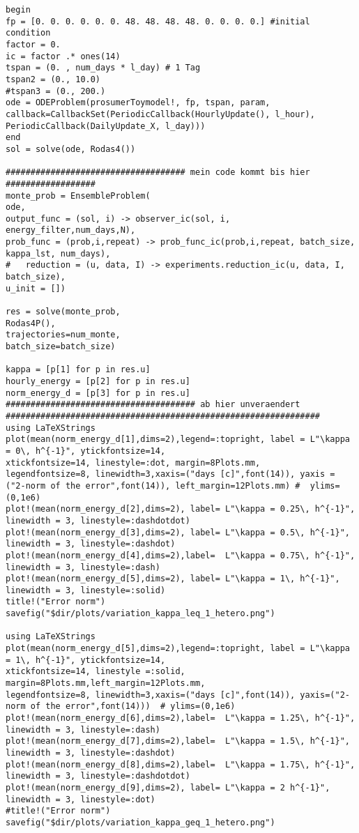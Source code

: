\begin{lstlisting}
begin
fp = [0. 0. 0. 0. 0. 0. 48. 48. 48. 48. 0. 0. 0. 0.] #initial condition
factor = 0.
ic = factor .* ones(14)
tspan = (0. , num_days * l_day) # 1 Tag
tspan2 = (0., 10.0)
#tspan3 = (0., 200.)
ode = ODEProblem(prosumerToymodel!, fp, tspan, param,
callback=CallbackSet(PeriodicCallback(HourlyUpdate(), l_hour),
PeriodicCallback(DailyUpdate_X, l_day)))
end
sol = solve(ode, Rodas4())

#################################### mein code kommt bis hier ##################
monte_prob = EnsembleProblem(
ode,
output_func = (sol, i) -> observer_ic(sol, i, energy_filter,num_days,N),
prob_func = (prob,i,repeat) -> prob_func_ic(prob,i,repeat, batch_size, kappa_lst, num_days),
#	reduction = (u, data, I) -> experiments.reduction_ic(u, data, I, batch_size),
u_init = [])

res = solve(monte_prob,
Rodas4P(),
trajectories=num_monte,
batch_size=batch_size)

kappa = [p[1] for p in res.u]
hourly_energy = [p[2] for p in res.u]
norm_energy_d = [p[3] for p in res.u]
###################################### ab hier unveraendert ###############################################################
using LaTeXStrings
plot(mean(norm_energy_d[1],dims=2),legend=:topright, label = L"\kappa = 0\, h^{-1}", ytickfontsize=14,
xtickfontsize=14, linestyle=:dot, margin=8Plots.mm,
legendfontsize=8, linewidth=3,xaxis=("days [c]",font(14)), yaxis = ("2-norm of the error",font(14)), left_margin=12Plots.mm) #  ylims=(0,1e6)
plot!(mean(norm_energy_d[2],dims=2), label= L"\kappa = 0.25\, h^{-1}", linewidth = 3, linestyle=:dashdotdot)
plot!(mean(norm_energy_d[3],dims=2), label= L"\kappa = 0.5\, h^{-1}", linewidth = 3, linestyle=:dashdot)
plot!(mean(norm_energy_d[4],dims=2),label=  L"\kappa = 0.75\, h^{-1}", linewidth = 3, linestyle=:dash)
plot!(mean(norm_energy_d[5],dims=2), label= L"\kappa = 1\, h^{-1}", linewidth = 3, linestyle=:solid)
title!("Error norm")
savefig("$dir/plots/variation_kappa_leq_1_hetero.png")

using LaTeXStrings
plot(mean(norm_energy_d[5],dims=2),legend=:topright, label = L"\kappa = 1\, h^{-1}", ytickfontsize=14,
xtickfontsize=14, linestyle =:solid, margin=8Plots.mm,left_margin=12Plots.mm,
legendfontsize=8, linewidth=3,xaxis=("days [c]",font(14)), yaxis=("2-norm of the error",font(14)))  # ylims=(0,1e6)
plot!(mean(norm_energy_d[6],dims=2),label=  L"\kappa = 1.25\, h^{-1}", linewidth = 3, linestyle=:dash)
plot!(mean(norm_energy_d[7],dims=2),label=  L"\kappa = 1.5\, h^{-1}", linewidth = 3, linestyle=:dashdot)
plot!(mean(norm_energy_d[8],dims=2),label=  L"\kappa = 1.75\, h^{-1}", linewidth = 3, linestyle=:dashdotdot)
plot!(mean(norm_energy_d[9],dims=2), label= L"\kappa = 2 h^{-1}", linewidth = 3, linestyle=:dot)
#title!("Error norm")
savefig("$dir/plots/variation_kappa_geq_1_hetero.png")



\end{lstlisting}